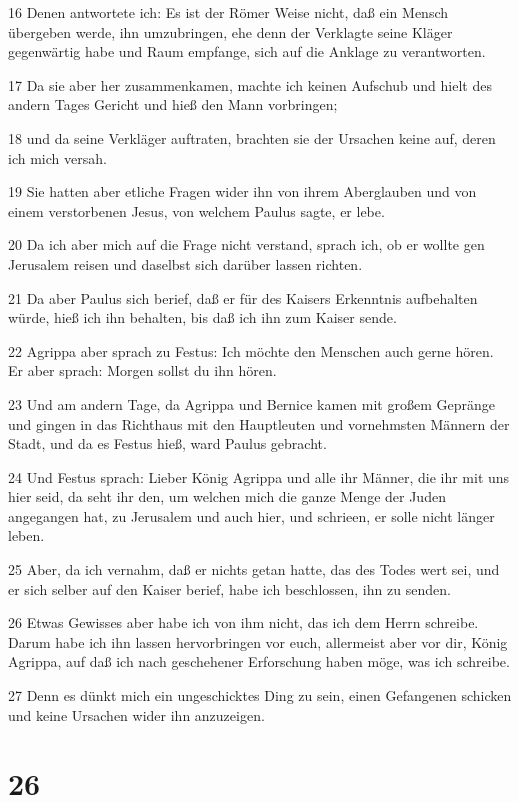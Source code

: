 \par 16 Denen antwortete ich: Es ist der Römer Weise nicht, daß ein Mensch übergeben werde, ihn umzubringen, ehe denn der Verklagte seine Kläger gegenwärtig habe und Raum empfange, sich auf die Anklage zu verantworten.
\par 17 Da sie aber her zusammenkamen, machte ich keinen Aufschub und hielt des andern Tages Gericht und hieß den Mann vorbringen;
\par 18 und da seine Verkläger auftraten, brachten sie der Ursachen keine auf, deren ich mich versah.
\par 19 Sie hatten aber etliche Fragen wider ihn von ihrem Aberglauben und von einem verstorbenen Jesus, von welchem Paulus sagte, er lebe.
\par 20 Da ich aber mich auf die Frage nicht verstand, sprach ich, ob er wollte gen Jerusalem reisen und daselbst sich darüber lassen richten.
\par 21 Da aber Paulus sich berief, daß er für des Kaisers Erkenntnis aufbehalten würde, hieß ich ihn behalten, bis daß ich ihn zum Kaiser sende.
\par 22 Agrippa aber sprach zu Festus: Ich möchte den Menschen auch gerne hören. Er aber sprach: Morgen sollst du ihn hören.
\par 23 Und am andern Tage, da Agrippa und Bernice kamen mit großem Gepränge und gingen in das Richthaus mit den Hauptleuten und vornehmsten Männern der Stadt, und da es Festus hieß, ward Paulus gebracht.
\par 24 Und Festus sprach: Lieber König Agrippa und alle ihr Männer, die ihr mit uns hier seid, da seht ihr den, um welchen mich die ganze Menge der Juden angegangen hat, zu Jerusalem und auch hier, und schrieen, er solle nicht länger leben.
\par 25 Aber, da ich vernahm, daß er nichts getan hatte, das des Todes wert sei, und er sich selber auf den Kaiser berief, habe ich beschlossen, ihn zu senden.
\par 26 Etwas Gewisses aber habe ich von ihm nicht, das ich dem Herrn schreibe. Darum habe ich ihn lassen hervorbringen vor euch, allermeist aber vor dir, König Agrippa, auf daß ich nach geschehener Erforschung haben möge, was ich schreibe.
\par 27 Denn es dünkt mich ein ungeschicktes Ding zu sein, einen Gefangenen schicken und keine Ursachen wider ihn anzuzeigen.

\chapter{26}

